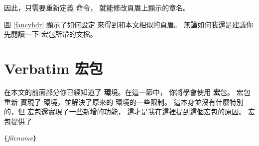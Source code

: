 
因此，只需要重新定義  命令，
就能修改頁眉上顯示的章名。


圖 \ref{fancyhdr} 顯示了如何設定  來得到和本文相似的頁眉。
無論如何我還是建議你先閱讀一下  宏包所帶的文檔。

\section{Verbatim 宏包}


在本文的前面部分你已經知道了  {\textbf
環境}。在這一節中， 你將學會使用  {\textbf
宏包}。  宏包重新
實現了  環境，並解決了原來的  環境的一些限制。
這本身並沒有什麼特別的，但  宏包還實現了一些新增的功能，
這才是我在這裡提到這個宏包的原因。  宏包提供了

\begin{lscommand}
\verb|{|\emph{filename}\verb|}|
\end{lscommand}



